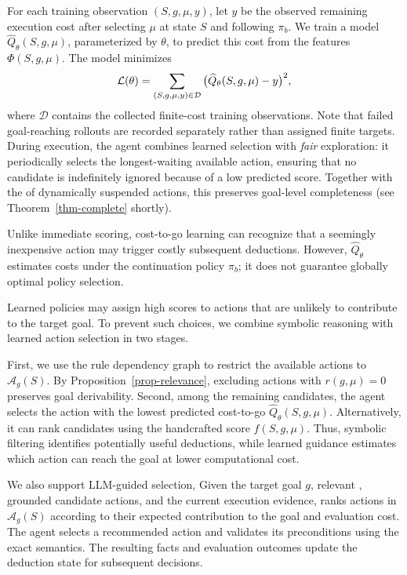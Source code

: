 For each training observation $(S,g,\mu,y)$,
let $y$ be the observed remaining execution cost
after selecting $\mu$ at state $S$ and following
$\pi_b$. We train a model
$\widehat Q_\theta(S,g,\mu)$, parameterized by
$\theta$, to predict this cost from the features
$\Phi(S,g,\mu)$. The model minimizes
\vspace{-0.7ex}\[
\mathcal L(\theta)=
\sum_{(S,g,\mu,y)\in\mathcal D}
\big(\widehat Q_\theta(S,g,\mu)-y\big)^2,
\vspace{-0.7ex}\]
where $\mathcal D$ contains the collected
finite-cost training observations. Note that
failed goal-reaching rollouts are recorded
separately rather than assigned finite targets.
During execution, the agent combines learned
selection with {\em fair} exploration: it periodically
selects the longest-waiting available action,
ensuring that no candidate is indefinitely
ignored because of a low predicted score.
Together with the  of dynamically
suspended actions, this preserves goal-level
completeness (see Theorem~\ref{thm-complete} shortly).



Unlike immediate scoring, cost-to-go learning
can recognize that a seemingly inexpensive
action may trigger costly subsequent deductions.
However, $\widehat Q_\theta$ estimates costs
under the continuation policy $\pi_b$;
it does not guarantee globally optimal
policy selection.


Learned policies may assign high scores to
actions that are unlikely to contribute to
the target goal. To prevent such choices,
we combine symbolic reasoning with learned
action selection in two stages.

First, we use the rule dependency graph
to restrict the available actions to
$\mathcal A_g(S)$.
By Proposition~\ref{prop-relevance},
excluding actions with $r(g,\mu)=0$
preserves goal derivability.
Second, among the remaining candidates,
the agent selects the action with the
lowest predicted cost-to-go
$\widehat Q_\theta(S,g,\mu)$.
Alternatively, it can rank candidates
using the handcrafted score $f(S,g,\mu)$.
Thus, symbolic filtering identifies
potentially useful deductions, while
learned guidance estimates which action
can reach the goal at lower computational
cost.

We also support LLM-guided selection,
Given the target goal $g$, relevant
\GARs, grounded candidate actions,
and the current execution evidence,
 ranks actions in $\mathcal A_g(S)$
according to their expected contribution
to the goal and evaluation cost.
The agent selects a recommended action
and validates its preconditions using
the exact \GAR semantics.
The resulting facts and evaluation outcomes
update the deduction state for subsequent
decisions.

